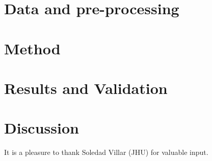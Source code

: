 \documentclass[modern]{aastex631}
\begin{document}
\section{Data and pre-processing}

\section{Method}

\section{Results and Validation}

\section{Discussion}

\begin{acknowledgements}
It is a pleasure to thank Soledad Villar (JHU) for valuable input.
\end{acknowledgements}
\end{document}
